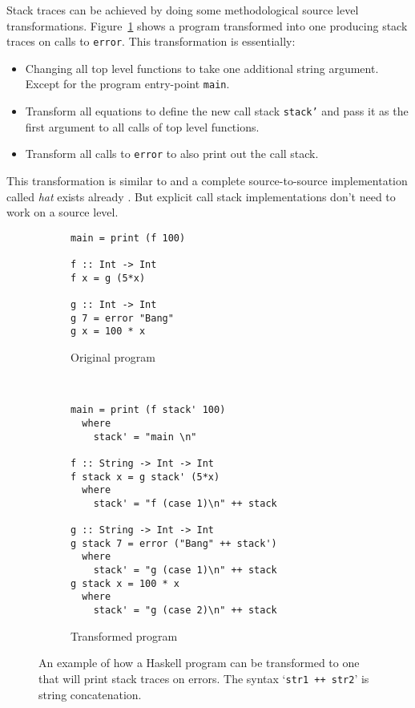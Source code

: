 Stack traces can be achieved by doing some methodological source level
transformations. Figure~\ref{fig:transformation} shows a program transformed
into one producing stack traces on calls to \texttt{error}. This transformation is essentially:

\begin{itemize}
\itemsep1pt\parskip0pt
\item
  Changing all top level functions to take one additional string
  argument. Except for the program entry-point \texttt{main}.
\item
  Transform all equations to define the new call stack \texttt{stack'} and
  pass it as the first argument to all calls of top level functions.
\item
  Transform all calls to \texttt{error} to also print out the call stack.
\end{itemize}

This transformation is similar to \cite{source_transformation} and a
complete source-to-source implementation called \emph{hat} exists already
\cite{hat_website}. But explicit call stack implementations don't need
to work on a source level.

\begin{figure}
\begin{mdframed}
        \begin{subfigure}[t]{0.4\textwidth}
            \begin{verbatim}
main = print (f 100)

f :: Int -> Int
f x = g (5*x)

g :: Int -> Int
g 7 = error "Bang"
g x = 100 * x
            \end{verbatim}
            \caption{Original program}
        \end{subfigure}
        ~ %
        \begin{subfigure}[t]{0.6\textwidth}
          \begin{verbatim}
main = print (f stack' 100)
  where
    stack' = "main \n"

f :: String -> Int -> Int
f stack x = g stack' (5*x)
  where
    stack' = "f (case 1)\n" ++ stack

g :: String -> Int -> Int
g stack 7 = error ("Bang" ++ stack')
  where
    stack' = "g (case 1)\n" ++ stack
g stack x = 100 * x
  where
    stack' = "g (case 2)\n" ++ stack
          \end{verbatim}
          \caption{Transformed program}
        \end{subfigure}
        \caption{An example of how a Haskell program can be transformed to one
          that will print stack traces on errors. The syntax `\texttt{str1 ++
            str2}' is string concatenation.
        }\label{fig:transformation}
\end{mdframed}
\end{figure}

